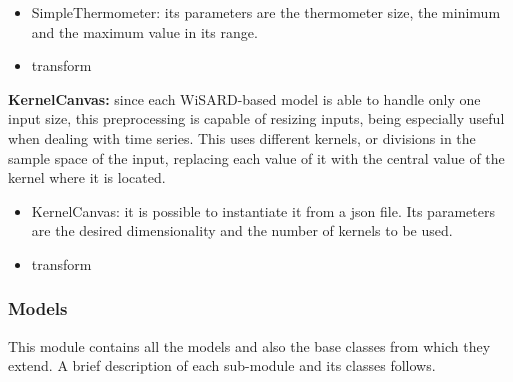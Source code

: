 \documentclass[12pt]{article}
\begin{document}
\begin{itemize}
    \item SimpleThermometer: its parameters are the thermometer size, the minimum and the maximum value in its range.
    \item transform
\end{itemize}

\textbf{KernelCanvas:} since each WiSARD-based model is able to handle only one input size, this preprocessing\cite{souza2014} is capable of resizing inputs, being especially useful when dealing with time series. This uses different kernels, or divisions in the sample space of the input, replacing each value of it with the central value of the kernel where it is located.

\begin{itemize}
    \item KernelCanvas: it is possible to instantiate it from a json file. Its parameters are the desired dimensionality and the number of kernels to be used.
    \item transform
\end{itemize}

\subsubsection{Models}

This module contains all the models and also the base classes from which they extend. A brief description of each sub-module and its classes follows.\\
\end{document}
